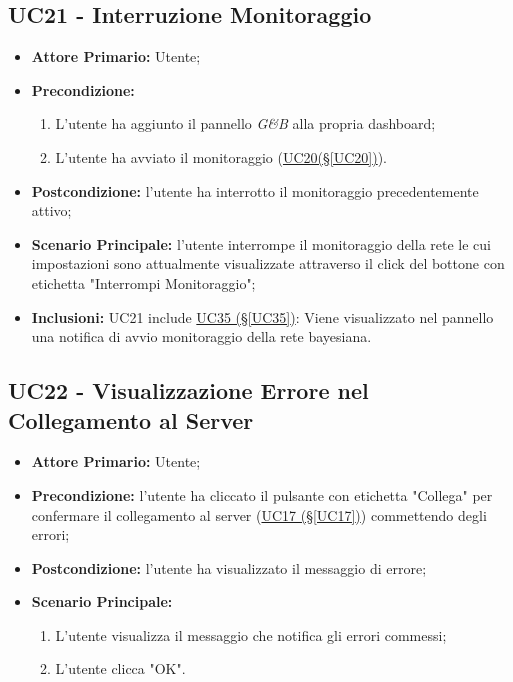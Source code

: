 \pagebreak

\subsection{UC21 - Interruzione Monitoraggio}\label{UC21}

\begin{itemize}
	\item \textbf{Attore Primario:} Utente;
	\item \textbf{Precondizione:}
	\begin{enumerate}
		\item L'utente ha aggiunto il pannello \textit{G\&B} alla propria dashboard;
		\item L'utente ha avviato il monitoraggio (\hyperref[UC20]{UC20(§\ref*{UC20})}).
	\end{enumerate}
	\item \textbf{Postcondizione:} l'utente ha interrotto il monitoraggio precedentemente attivo;
	\item \textbf{Scenario Principale:} l'utente interrompe il monitoraggio della rete le cui impostazioni sono attualmente visualizzate attraverso il click del bottone con etichetta "Interrompi Monitoraggio";
	\item \textbf{Inclusioni:} UC21 include \hyperref[UC35]{UC35 (§\ref*{UC35})}: Viene visualizzato nel pannello una notifica di avvio monitoraggio della rete bayesiana.
\end{itemize}

\pagebreak

\subsection{UC22 - Visualizzazione Errore nel Collegamento al Server}\label{UC22}
\begin{itemize}
	\item \textbf{Attore Primario:}  Utente;
	\item \textbf{Precondizione:} l'utente ha cliccato il pulsante con etichetta "Collega" per confermare il collegamento al server (\hyperref[UC17]{UC17 (§\ref*{UC17})}) commettendo degli errori;
	\item \textbf{Postcondizione:} l'utente ha visualizzato il messaggio di errore;
	\item \textbf{Scenario Principale:}
	\begin{enumerate}
		\item L'utente visualizza il messaggio che notifica gli errori commessi;
		\item L'utente clicca "OK".
	\end{enumerate}
\end{itemize}

